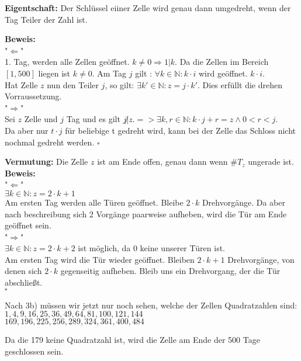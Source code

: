 \documentclass[11pt,a4paper,ngerman]{article}
\newcommand{\N}{\mathbb{N}}
\begin{document}
\vspace{30px}

\textbf{Eigentschaft:} Der Schlüssel eiiner Zelle wird genau dann umgedreht, wenn der Tag Teiler der Zahl ist.

\textbf{Beweis:} \\
"$\Leftarrow$"\\
1. Tag, werden alle Zellen geöffnet. $k\not= 0 \Rightarrow 1 | k $. Da die Zellen im Bereich $[1,500]$ liegen ist $k \not= 0$.
Am Tag $j$ gilt : $\forall k\in \N : k\cdot i$ wird geöffnet. $k \cdot i$.\\
Hat Zelle $z$ nun den Teiler $j$, so gilt: $\exists k' \in \N : z = j \cdot k'$. Dies erfüllt die drehen Vorraussetzung.\\
"$\Rightarrow$"\\
Sei $z$ Zelle und $j$ Tag und es gilt $j \not | z. => \exists k,r \in \N : k\cdot j + r = z \land 0<r<j$.\\
Da aber nur $t\cdot j$ für beliebige t gedreht wird, kann bei der Zelle das Schloss nicht nochmal gedreht werden.
\mbox{} \hfill $\square$


\textbf{Vermutung:} Die Zelle $z$ ist am Ende offen, genau dann wenn $\#T_z$ ungerade ist.\\
\textbf{Beweis:}\\
"$\Leftarrow$"\\
$\exists k \in \N : z = 2 \cdot k + 1$\\
Am ersten Tag werden alle Türen geöffnet. Bleibe $2\cdot k$ Drehvorgänge. Da aber nach beschreibung sich 2 Vorgänge paarweise aufheben,
wird die Tür am Ende geöffnet sein.\\
"$\Rightarrow$"\\
$\exists k \in \N : z = 2 \cdot k + 2$ ist möglich, da 0 keine unserer Türen ist.\\
Am ersten Tag wird die Tür wieder geöffnet. Bleiben $2\cdot k +1$ Drehvorgänge, von denen sich $2\cdot k$ gegenseitig aufheben. Bleib uns ein Drehvorgang, der die Tür abschließt.\\
\mbox{} \hfill $\square$

\vspace{15px}

Nach 3b) müssen wir jetzt nur noch sehen, welche der Zellen Quadratzahlen sind:
$1, 4, 9, 16, 25, 36, 49, 64, 81, 100, 121, 144$\\
$169, 196, 225, 256, 289, 324, 361, 400, 484$

\vspace{10px}

Da die 179 keine Quadratzahl ist, wird die Zelle am Ende der 500 Tage geschlossen sein.


\label{LastPage}
\end{document}
